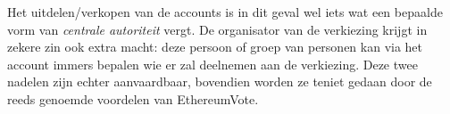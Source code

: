 	Het uitdelen/verkopen van de accounts is in dit geval wel iets wat een bepaalde vorm van \textit{centrale autoriteit} vergt. De organisator van de verkiezing krijgt in zekere zin ook extra macht: deze persoon of groep van personen kan via het account immers bepalen wie er zal deelnemen aan de verkiezing. Deze  twee nadelen zijn echter aanvaardbaar, bovendien worden ze teniet gedaan door de reeds genoemde voordelen van EthereumVote.
	
	

	

	
	
	
	
	
	
	
	
	
	
	
	
	
	
	
	
	
	
	
	
	

	








